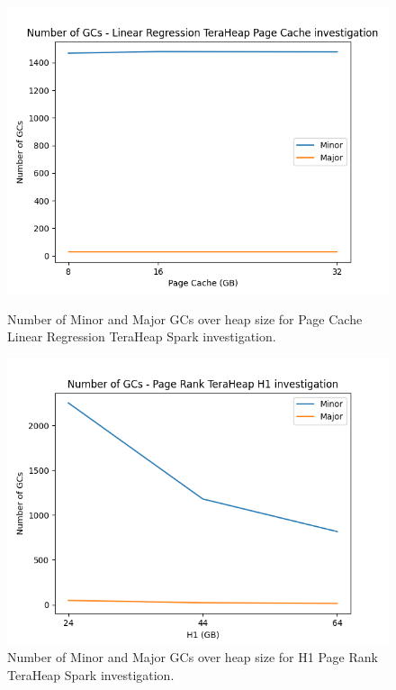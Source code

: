 \begin{figure}[thbp]
    \includegraphics[width=\linewidth]{./fig/gcs_linr_pc_th.png}
    \caption{Number of Minor and Major GCs over heap size for Page Cache Linear Regression
    TeraHeap Spark investigation.}
    \label{fig:gcs_linr_pc_th}  

    \includegraphics[width=\linewidth]{./fig/gcs_pr_h1_th.png}
    \caption{Number of Minor and Major GCs over heap size for H1 Page Rank TeraHeap Spark
    investigation.}
    \label{fig:gcs_pr_h1_th}
\end{figure}

